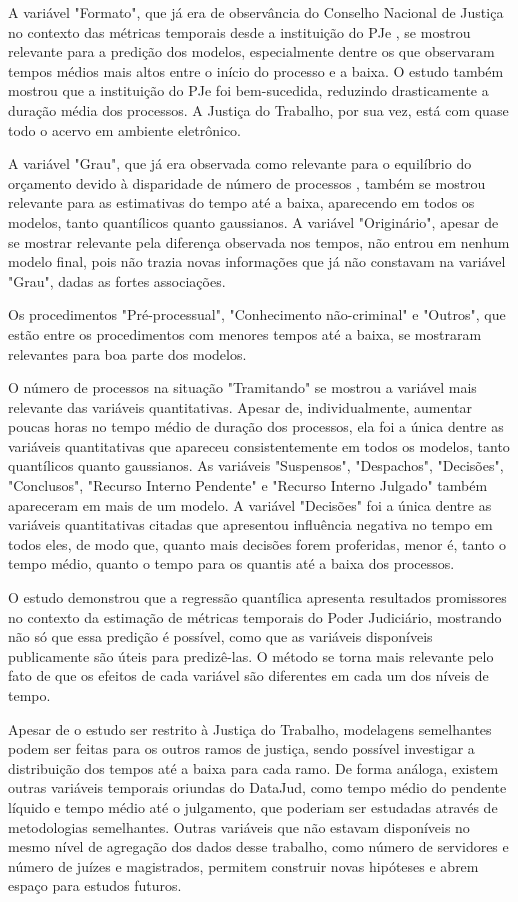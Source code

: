 
A variável "Formato", que já era de observância do Conselho Nacional de Justiça no contexto das métricas temporais desde a instituição do PJe \cite{pje}, se mostrou relevante para a predição dos modelos, especialmente dentre os que observaram tempos médios mais altos entre o início do processo e a baixa. O estudo também mostrou que a instituição do PJe foi bem-sucedida, reduzindo drasticamente a duração média dos processos. A Justiça do Trabalho, por sua vez, está com quase todo o acervo em ambiente eletrônico. 

A variável "Grau", que já era observada como relevante para o equilíbrio do orçamento devido à disparidade de número de processos \cite{justicaemnumeros}, também se mostrou relevante para as estimativas do tempo até a baixa, aparecendo em todos os modelos, tanto quantílicos quanto gaussianos. A variável "Originário", apesar de se mostrar relevante pela diferença observada nos tempos, não entrou em nenhum modelo final, pois não trazia novas informações que já não constavam na variável "Grau", dadas as fortes associações.

Os procedimentos "Pré-processual", "Conhecimento não-criminal"  e "Outros", que estão entre os procedimentos com menores tempos até a baixa, se mostraram relevantes para boa parte dos modelos.

O número de processos na situação "Tramitando" se mostrou a variável mais relevante das variáveis quantitativas. Apesar de, individualmente, aumentar poucas horas no tempo médio de duração dos processos, ela foi a única dentre as variáveis quantitativas que apareceu consistentemente em todos os modelos, tanto quantílicos quanto gaussianos. As variáveis "Suspensos", "Despachos", "Decisões", "Conclusos", "Recurso Interno Pendente" e "Recurso Interno Julgado" também apareceram em mais de um modelo. A variável "Decisões" foi a única dentre as variáveis quantitativas citadas que apresentou influência negativa no tempo em todos eles, de modo que, quanto mais decisões forem proferidas, menor é, tanto o tempo médio, quanto o tempo para os quantis até a baixa dos processos.

O estudo demonstrou que a regressão quantílica apresenta resultados promissores no contexto da estimação de métricas temporais do Poder Judiciário, mostrando não só que essa predição é possível, como que as variáveis disponíveis publicamente são úteis para predizê-las. O método se torna mais relevante pelo fato de que os efeitos de cada variável são diferentes em cada um dos níveis de tempo.

Apesar de o estudo ser restrito à Justiça do Trabalho, modelagens semelhantes podem ser feitas para os outros ramos de justiça, sendo possível investigar a distribuição dos tempos até a baixa para cada ramo. De forma análoga, existem outras variáveis temporais oriundas do DataJud, como tempo médio do pendente líquido e tempo médio até o julgamento, que poderiam ser estudadas através de metodologias semelhantes. Outras variáveis que não estavam disponíveis no mesmo nível de agregação dos dados desse trabalho, como número de servidores e número de juízes e magistrados, permitem construir novas hipóteses e abrem espaço para estudos futuros.
\newpage